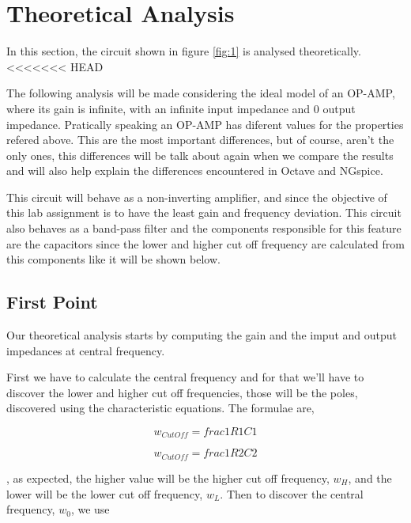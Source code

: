 \section{Theoretical Analysis}
\label{sec:theoretical}

\par In this section, the circuit shown in figure \ref{fig:1} is analysed theoretically.
<<<<<<< HEAD
\par The following analysis will be made considering the ideal model of an OP-AMP, where its gain is infinite, with an infinite input impedance and 0 output impedance. Pratically speaking an OP-AMP has diferent values for the properties refered above. This are the most important differences, but of course, aren't the only ones, this differences will be talk about again when we compare the results and will also help explain the differences encountered in Octave and NGspice.  
\par This circuit will behave as a non-inverting amplifier, and since the objective of this lab assignment is to have the least gain and frequency deviation. This circuit also behaves as a band-pass filter and the components responsible for this feature are the capacitors since the lower and higher cut off frequency are calculated from this components like it will be shown below.

\subsection{First Point}

\par Our theoretical analysis starts by computing the gain and the imput and output impedances at central frequency.
\par First we have to calculate the central frequency and for that we'll have to discover the lower and higher cut off frequencies, those will be the poles, discovered using the characteristic equations. The formulae are,

\begin{equation}
	w_{CutOff} = frac{1}{R1C1}
\end{equation}

\begin{equation}
	w_{CutOff} = frac{1}{R2C2}
\end{equation}

, as expected, the higher value will be the higher cut off frequency, $w_H$, and the lower will be the lower cut off frequency, $w_L$. Then to discover the central frequency, $w_0$, we use 

